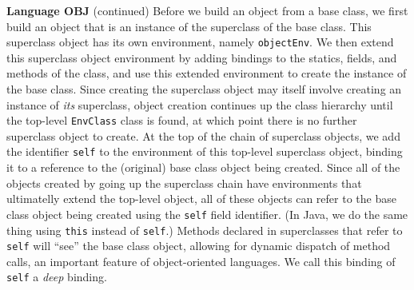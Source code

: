 \begin{minipage}[t]{\sw}
\slidenumber
\LARGE
{\bf Language OBJ} (continued)\exx
Before we build an object from a base class,
we first build an object that is an instance
of the superclass of the base class.
This superclass object has its own environment, namely \verb'objectEnv'.
We then extend this superclass object environment
by adding bindings to the statics, fields, and methods of the class,
and use this extended environment
to create the instance of the base class.\exx
Since creating the superclass object may itself involve
creating an instance of {\em its} superclass,
object creation continues up the class hierarchy
until the top-level \verb'EnvClass' class is found,
at which point there is no further superclass object to create.\exx
At the top of the chain of superclass objects,
we add the identifier \verb'self'
to the environment of this top-level superclass object,
binding it to a reference to the (original)
base class object being created.
Since all of the objects created
by going up the superclass chain have environments
that ultimatelly extend the top-level object,
all of these objects can refer to the base class object being created
using the \verb'self' field identifier.
(In Java, we do the same thing using \verb'this' instead of \verb'self'.)
Methods declared in superclasses
that refer to \verb'self' will ``see'' the base class object,
allowing for dynamic dispatch of method calls,
an important feature of object-oriented languages.
We call this binding of \verb'self' a {\em deep} binding.
\end{minipage}
